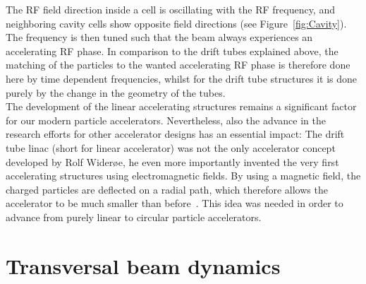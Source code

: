 The RF field direction inside a cell is oscillating with the RF frequency, and neighboring cavity cells show opposite field directions (see Figure~\ref{fig:Cavity}).
The frequency is then tuned such that the beam always experiences an accelerating RF phase.
In comparison to the drift tubes explained above, the matching of the particles to the wanted accelerating RF phase is therefore done here by time dependent frequencies, whilst for the drift tube structures it is done purely by the change in the geometry of the tubes.
\\
The development of the linear accelerating structures remains a significant factor for our modern particle accelerators.
Nevertheless, also the advance in the research efforts for other accelerator designs has an essential impact:
The drift tube linac (short for linear accelerator) was not the only accelerator concept developed by Rolf Wider\o e, he even more importantly invented the very first accelerating structures using electromagnetic fields.
By using a magnetic field, the charged particles are deflected on a radial path, which therefore allows the accelerator to be much smaller than before~\cite[cf. p. 8]{Wilson}.
This idea was needed in order to advance from purely linear to circular particle accelerators.


\section{Transversal beam dynamics}
\label{AccPhysics:Magnets}

